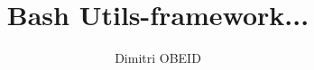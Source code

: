 \documentclass[a4paper,10pt]{article}
\title{\color{red}Bash Utils-framework...}\color{text}
\author{Dimitri OBEID}
\begin{document}
    \maketitle
    \newpage

    \hypertarget{contents}{}
    \tableofcontents
    \newpage

    \color{sec1}
    \section{}\color{text}




\end{document}
